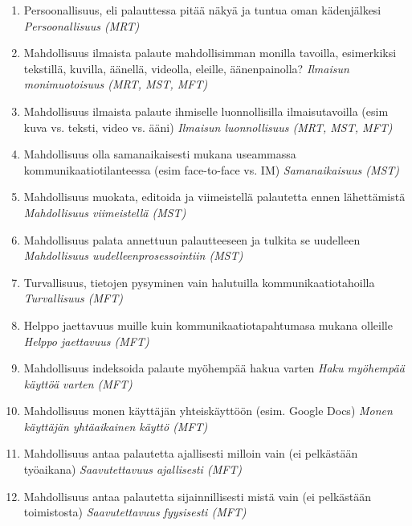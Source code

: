 \documentclass[english,12pt,a4paper,pdftex]{article}
\begin{document}
\begin{enumerate}
\begin{enumerate}
    \item Persoonallisuus, eli palauttessa pitää näkyä ja tuntua oman kädenjälkesi \textit{Persoonallisuus (MRT)}
    
    \item Mahdollisuus ilmaista palaute mahdollisimman monilla tavoilla, esimerkiksi tekstillä, kuvilla, äänellä, videolla, eleille, äänenpainolla? \textit{Ilmaisun monimuotoisuus (MRT, MST, MFT)}
    
    \item Mahdollisuus ilmaista palaute ihmiselle luonnollisilla ilmaisutavoilla (esim kuva vs. teksti, video vs. ääni) \textit{Ilmaisun luonnollisuus (MRT, MST, MFT)}
    
    \item Mahdollisuus olla samanaikaisesti mukana useammassa kommunikaatiotilanteessa (esim face-to-face vs. IM) \textit{Samanaikaisuus (MST)}
    
    \item Mahdollisuus muokata, editoida ja viimeistellä palautetta ennen lähettämistä \textit{Mahdollisuus viimeistellä (MST)}
    
    \item Mahdollisuus palata annettuun palautteeseen ja tulkita se uudelleen \textit{Mahdollisuus uudelleenprosessointiin (MST)}
    
    \item Turvallisuus, tietojen pysyminen vain halutuilla kommunikaatiotahoilla \textit{Turvallisuus (MFT)}
    
    \item Helppo jaettavuus muille kuin kommunikaatiotapahtumasa mukana olleille \textit{Helppo jaettavuus (MFT)}
    
    \item Mahdollisuus indeksoida palaute myöhempää hakua varten \textit{Haku myöhempää käyttöä varten (MFT)}
    
    \item Mahdollisuus monen käyttäjän yhteiskäyttöön (esim. Google Docs) \textit{Monen käyttäjän yhtäaikainen käyttö (MFT)}
    
    \item Mahdollisuus antaa palautetta ajallisesti milloin vain (ei pelkästään työaikana) \textit{Saavutettavuus ajallisesti (MFT)}
    
    \item Mahdollisuus antaa palautetta sijainnillisesti mistä vain (ei pelkästään toimistosta) \textit{Saavutettavuus fyysisesti (MFT)}
    

\end{enumerate}
\end{enumerate}
\end{document}

